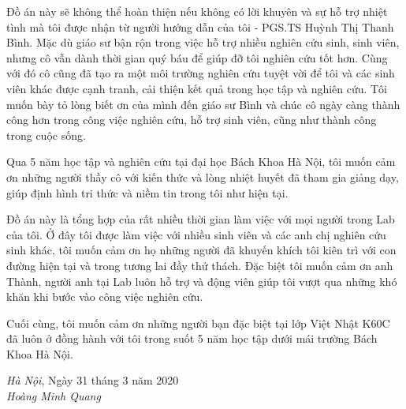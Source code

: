 Đồ án này sẽ không thể hoàn thiện nếu không có lời khuyên và sự hỗ trợ nhiệt tình mà tôi được nhận từ người hướng dẫn của tôi - PGS.TS Huỳnh Thị Thanh Bình. Mặc dù giáo sư bận rộn trong việc hỗ trợ nhiều nghiên cứu sinh, sinh viên, nhưng cô vẫn dành thời gian quý báu để giúp đỡ tôi nghiên cứu tốt hơn. Cùng với đó cô cũng đã tạo ra một môi trường nghiên cứu tuyệt vời để tôi và các sinh viên khác được cạnh tranh, cải thiện kết quả trong học tập và nghiên cứu. Tôi muốn bày tỏ lòng biết ơn của mình đến giáo sư Bình và chúc cô ngày càng thành công hơn trong công việc nghiên cứu, hỗ trợ sinh viên, cũng như thành công trong cuộc sống. 

Qua 5 năm học tập và nghiên cứu tại đại học Bách Khoa Hà Nội, tôi muốn cảm ơn những người thầy cô với kiến thức và lòng nhiệt huyết đã tham gia giảng dạy, giúp định hình tri thức và niềm tin trong tôi như hiện tại.

Đồ án này là tổng hợp của rất nhiều thời gian làm việc với mọi người trong Lab của tôi. Ở đây tôi được làm việc với nhiều sinh viên và các anh chị nghiên cứu sinh khác, tôi muốn cảm ơn họ những người đã khuyến khích tôi kiên trì với con đường hiện tại và trong tương lai đầy thử thách. Đặc biệt tôi muốn cảm ơn anh Thành, người anh tại Lab luôn hỗ trợ và động viên giúp tôi vượt qua những khó khăn khi bước vào công việc nghiên cứu.

Cuối cùng, tôi muốn cảm ơn những người bạn đặc biệt tại lớp Việt Nhật K60C đã luôn ở đồng hành với tôi trong suốt 5 năm học tập dưới mái trường Bách Khoa Hà Nội. 

\begin{flushright}
\begin{minipage}[t]{0.5\textwidth}
\begin{center}
  \textit{Hà Nội}, Ngày 31 tháng 3 năm 2020\\
  
  \textit{Hoàng Minh Quang}
\end{center}
\end{minipage}
\end{flushright}

\pagebreak